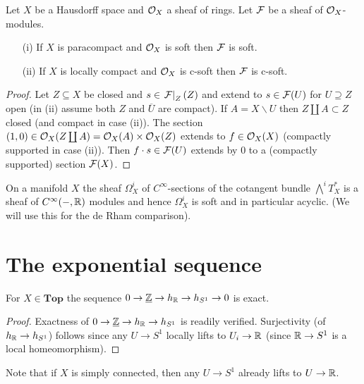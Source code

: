 \documentclass[../main.tex]{subfiles}
\begin{document}
\begin{lem}
    Let $X$ be a Hausdorff space and $\mathcal{O}_X$ a sheaf of rings. Let $\mathcal{F}$ be a sheaf of $\mathcal{O}_X$-modules.
    \begin{enumerate}
        \item[(i)] If $X$ is paracompact and $\mathcal{O}_X$ is soft then $\mathcal{F}$ is soft.
        \item[(ii)] If $X$ is locally compact and $\mathcal{O}_X$ is c-soft then $\mathcal{F}$ is c-soft.
    \end{enumerate}
\end{lem}
\begin{proof}
    Let $Z\subseteq X$ be closed and $s\in \left.\mathcal{F}\right|_{Z}(Z)$ and extend to $s\in \mathcal{F}(U)$ for $U\supseteq Z$ open (in (ii) assume both $Z$ and $\overline{U}$ are compact). If $A = X\backslash U$ then $Z \coprod A \subset Z$ closed (and compact in case (ii)). The section $(1,0) \in \mathcal{O}_X(Z\coprod A) = \mathcal{O}_X(A)\times \mathcal{O}_X(Z)$ extends to $f\in \mathcal{O}_X(X)$ (compactly supported in case (ii)). Then $f\cdot s \in \mathcal{F}(U)$ extends by $0$ to a (compactly supported) section $\mathcal{F}(X)$. 
\end{proof}

\begin{exmp}
    On a manifold $X$ the sheaf $\Omega^i_X$ of $C^\infty$-sections of the cotangent bundle $\bigwedge^i T_X^*$ is a sheaf of $C^\infty(-, \mathbb{R})$ modules and hence $\Omega_X^i$ is soft and in particular acyclic. (We will use this for the de Rham comparison).
\end{exmp}

\section{The exponential sequence}

\begin{lem}
    For $X\in\textbf{Top}$ the sequence $0\to \underline{\mathbb{Z}} \to h_{\mathbb{R}}\to h_{S^1} \to 0$ is exact.
\end{lem}

\begin{proof}
    Exactness of $0\to \underline{\mathbb{Z}}\to h_{\mathbb{R}}\to h_{S^1}$ is readily verified. Surjectivity (of $h_{\mathbb{R}}\to h_{S^1}$) follows since any $U\to S^1$ locally lifts to $U_i\to \mathbb{R}$ (since $\mathbb{R}\to S^1$ is a local homeomorphism).
\end{proof}

\begin{rmk}
    Note that if $X$ is simply connected, then any $U\to S^1$ already lifts to $U\to \mathbb{R}$.
\end{rmk}
\end{document}
